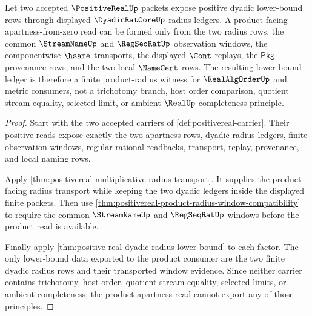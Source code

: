 \begin{theorem}
\label{thm:positive-real-product-lower-bound-apartness}
Let two accepted $\PositiveRealUp$ packets expose positive dyadic lower-bound
rows through displayed $\DyadicRatCoreUp$ radius ledgers. A product-facing
apartness-from-zero read can be formed only from the two radius rows, the common
$\StreamNameUp$ and $\RegSeqRatUp$ observation windows, the componentwise
$\hsame$ transports, the displayed $\Cont$ replays, the $\mathsf{Pkg}$
provenance rows, and the two local $\NameCert$ rows. The resulting lower-bound
ledger is therefore a finite product-radius witness for $\RealAlgOrderUp$ and
metric consumers, not a trichotomy branch, host order comparison, quotient
stream equality, selected limit, or ambient $\RealUp$ completeness principle.
\end{theorem}
\begin{proof}
Start with the two accepted carriers of \autoref{def:positivereal-carrier}.
Their positive reads expose exactly the two apartness rows, dyadic radius
ledgers, finite observation windows, regular-rational readbacks, transport,
replay, provenance, and local naming rows.

Apply \autoref{thm:positivereal-multiplicative-radius-transport}. It supplies
the product-facing radius transport while keeping the two dyadic ledgers inside
the displayed finite packets. Then use
\autoref{thm:positivereal-product-radius-window-compatibility} to require the
common $\StreamNameUp$ and $\RegSeqRatUp$ windows before the product read is
available.

Finally apply \autoref{thm:positive-real-dyadic-radius-lower-bound} to each
factor. The only lower-bound data exported to the product consumer are the two
finite dyadic radius rows and their transported window evidence. Since neither
carrier contains trichotomy, host order, quotient stream equality, selected
limits, or ambient completeness, the product apartness read cannot export any
of those principles.
\end{proof}

